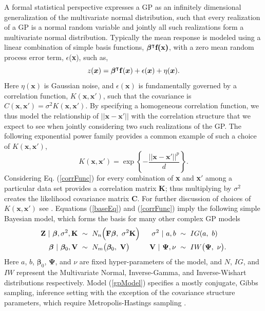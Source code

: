 \documentclass[12pt]{article}
\begin{document}
	A formal statistical perspective expresses a GP as an infinitely dimensional generalization of the multivariate normal distribution, such that every realization of a GP is a normal random variable and jointly all such realizations form a multivariate normal distribution. 
	Typically the mean response is modeled using a linear combination of simple basis functions, $\bm{\beta}^\intercal \text{\textbf{f(x)}}$, with a zero mean random process error term, $\epsilon$(\textbf{x}), such as,
	\begin{equation}
	z(\bm{x}) = \bm{\beta}^\intercal \text{\textbf{f}}(\bm{x}) + \epsilon(\bm{x}) + \eta(\bm{x}).
	\label{baseEq}
	\end{equation} 
	Here $\eta(\bm{x})$ is Gaussian noise, and $\epsilon(\bm{x})$ is fundamentally governed by a correlation function, $ K(\bm{x}, \bm{x}')$, such that the covariance is $C(\bm{x}, \bm{x}')=\sigma^2K(\bm{x}, \bm{x}')$. 
	By specifying a homogeneous correlation function, we thus model the relationship of $||\bm{x}-\bm{x}'||$ with the correlation structure that we expect to see when jointly considering two such realizations of the GP.
	The following exponential power family provides a common example of such a choice of $K(\bm{x}, \bm{x}')$,
	\begin{equation}
	K(\bm{x}, \bm{x}') = \exp\left\{ -\frac{||\bm{x}-\bm{x}'||^p}{d} \right\}.
	\label{corrFunc}
	\end{equation}
	Considering Eq. (\ref{corrFunc}) for every combination of \textbf{x} and \textbf{x}$'$ among a particular data set provides a correlation matrix \textbf{K}; thus multiplying by $\sigma^2$ creates the likelihood covariance matrix \textbf{C}.
	For further discussion of choices of $K(\bm{x}, \bm{x}')$ see \cite{steinBook}.
	Equations (\ref{baseEq}) and (\ref{corrFunc}) imply the following simple Bayesian model, which forms the basis for many other complex GP models  
	\begin{equation}
	\begin{aligned}
	\text{\textbf{Z}} ~|~ \bm{\beta}, \sigma^2, \text{\textbf{K}} &~\sim~ N_n\Big(\text{\textbf{F}}\bm{\beta},~ \sigma^2\text{\textbf{K}}\Big)
	&~ \sigma^2 ~|~ a, b &~\sim~ IG(a, ~b)
	\\
	\bm{\beta} ~|~ \bm{\beta}_0, \text{\textbf{V}} &~\sim~ N_m\big(\bm{\beta}_0,~ \text{\textbf{V}}\big) &~
	\text{\textbf{V}} ~|~ \bm{\Psi}, \nu &~\sim~ IW\big(\bm{\Psi}, ~\nu\big).
	\label{gpModel}
	\end{aligned}
	\end{equation}
	Here $a$, $b$, $\bm{\beta}_0$, $\bm{\Psi}$, and $\nu$ are fixed hyper-parameters of the model, and $N$, $IG$, and $IW$ represent the Multivariate Normal, Inverse-Gamma, and Inverse-Wishart distributions respectively.
	Model (\ref{gpModel}) specifies a mostly conjugate, Gibbs sampling, inference setting with the exception of the covariance structure parameters, which require Metropolis-Hastings sampling \cite{gpJasa}.
	
\end{document}
